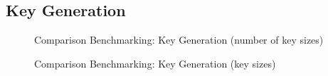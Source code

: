 \documentclass[]{final_report}
\theoremstyle{definition}
\begin{document}
\subsection{Key Generation}
\begin{figure}[H]
    \centering %
    
    \begin{minipage}{0.495\textwidth}
        \centering
        \caption{Comparison Benchmarking: Key Generation (number of key sizes)}
        \label{fig:image1}
    \end{minipage}
    \hfill %
    \begin{minipage}{0.495\textwidth}
        \centering
        \caption{Comparison Benchmarking: Key Generation (key sizes)}
        \label{fig:image2}
    \end{minipage}
    

\end{figure}
\end{document}
